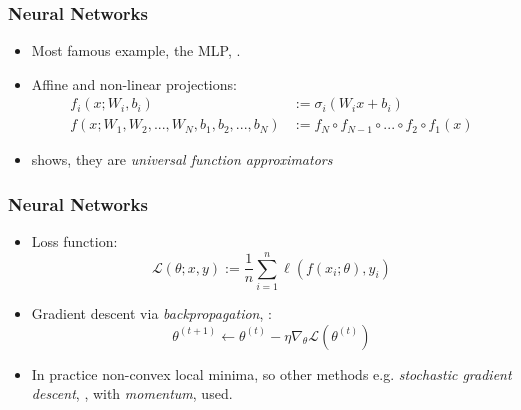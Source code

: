 \documentclass[handout]{beamer}
\begin{document}
\begin{frame}
    \frametitle{Neural Networks}
     \begin{itemize}
         \item Most famous example, the MLP, {\color{blue}\cite{RUMELHART1986}}.
        \item Affine and non-linear projections:
            \begin{equation*}
                \begin{aligned}
                    f_i(x; W_i, b_i) &:= \sigma_i(W_i x + b_i) \\
                    f(x; W_1, W_2, ..., W_N, b_1, b_2, ..., b_N) &:= f_N \circ f_{N-1} \circ ... \circ f_2 \circ f_1(x)
                \end{aligned}
            \end{equation*}
        \item {\color{blue}\cite{HORNIK1989}} shows, they are \textit{universal function approximators}
        \end{itemize}
\end{frame}

\begin{frame}
    \frametitle{Neural Networks}
     \begin{itemize}
     \item Loss function:
        \begin{equation}
           \mathcal{L} (\theta; x, y) := \frac{1}{n} \sum_{i=1}^{n} \ell(f(x_i; \theta), y_i)
        \end{equation}
    \item Gradient descent via \textit{backpropagation}, {\color{blue}\cite{RUMELHART1986}}:
        \begin{equation}
            \theta^{(t+1)} \gets \theta^{(t)} - \eta \nabla_\theta \mathcal{L}(\theta^{(t)})
        \end{equation}
    \item In practice non-convex local minima, so other methods e.g. \textit{stochastic gradient descent}, {\color{blue}\cite{ROBBINS1951}}, with \textit{momentum}, used.
\end{itemize}
\end{frame}
\end{document}
